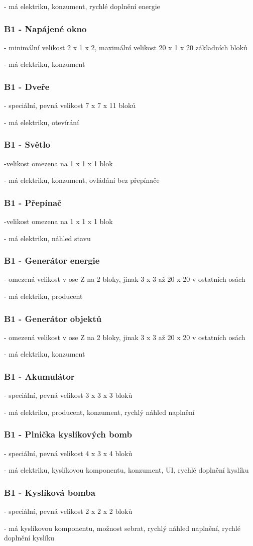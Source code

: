 - má elektriku, konzument, rychlé doplnění energie
\subsubsection{B1 - Napájené okno}
- minimální velikost 2 x 1 x 2, maximální velikost 20 x 1 x 20 základních bloků

- má elektriku, konzument
\subsubsection{B1 - Dveře}
- speciální, pevná velikost 7 x 7 x 11 bloků

- má elektriku, otevírání
\subsubsection{B1 - Světlo}
-velikost omezena na 1 x 1 x 1 blok

- má elektriku, konzument, ovládání bez přepínače
\subsubsection{B1 - Přepínač}
-velikost omezena na 1 x 1 x 1 blok

- má elektriku, náhled stavu
\subsubsection{B1 - Generátor energie}
- omezená velikost v ose Z na 2 bloky, jinak 3 x 3 až 20 x 20 v ostatních osách

- má elektriku, producent
\subsubsection{B1 - Generátor objektů}
- omezená velikost v ose Z na 2 bloky, jinak 3 x 3 až 20 x 20 v ostatních osách

- má elektriku, konzument
\subsubsection{B1 - Akumulátor}
- speciální, pevná velikost 3 x 3 x 3 bloků

- má elektriku, producent, konzument, rychlý náhled naplnění
\subsubsection{B1 - Plnička kyslíkových bomb}
- speciální, pevná velikost 4 x 3 x 4 bloků

- má elektriku, kyslíkovou komponentu, konzument, UI, rychlé doplnění kyslíku

\subsubsection{B1 - Kyslíková bomba}
- speciální, pevná velikost 2 x 2 x 2 bloků

- má kyslíkovou komponentu, možnost sebrat, rychlý náhled naplnění, rychlé doplnění kyslíku
                                                  

